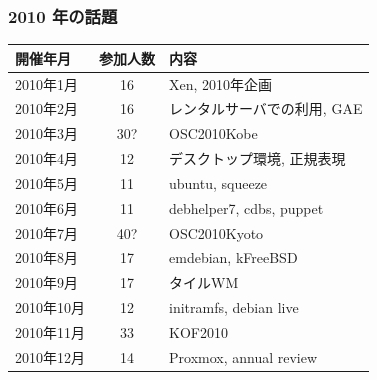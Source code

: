 \documentclass[cjk,dvipdfmx,10pt,compress,%
hyperref={bookmarks=true,bookmarksnumbered=true,bookmarksopen=false,%
colorlinks=false,%
pdftitle={第 121 回 関西 Debian 勉強会},%
pdfauthor={倉敷・のがた・佐々木・かわだ},%
pdfsubject={資料},%
}]{beamer}
\begin{document}
\begin{frame}[fragile]
  \frametitle{2010 年の話題}
    \begin{table}
        \begin{center}
          \begin{tabular}{|l|c|p{16em}|}
            開催年月   & 参加人数 & 内容 \\
            \hline
            2010年1月  & 16       & Xen, 2010年企画 \\
            2010年2月  & 16       & レンタルサーバでの利用, GAE \\
            2010年3月  & 30?      & OSC2010Kobe \\
            2010年4月  & 12       & デスクトップ環境, 正規表現 \\
            2010年5月  & 11       & ubuntu, squeeze \\
            2010年6月  & 11       & debhelper7, cdbs, puppet \\
            2010年7月  & 40?      & OSC2010Kyoto \\
            2010年8月  & 17       & emdebian, kFreeBSD \\
            2010年9月  & 17       & タイルWM \\
            2010年10月 & 12       & initramfs, debian live \\
            2010年11月 & 33       & KOF2010 \\
            2010年12月 & 14       & Proxmox, annual review \\
            \hline
          \end{tabular}
        \end{center}
    \end{table}
\end{frame}
\end{document}
